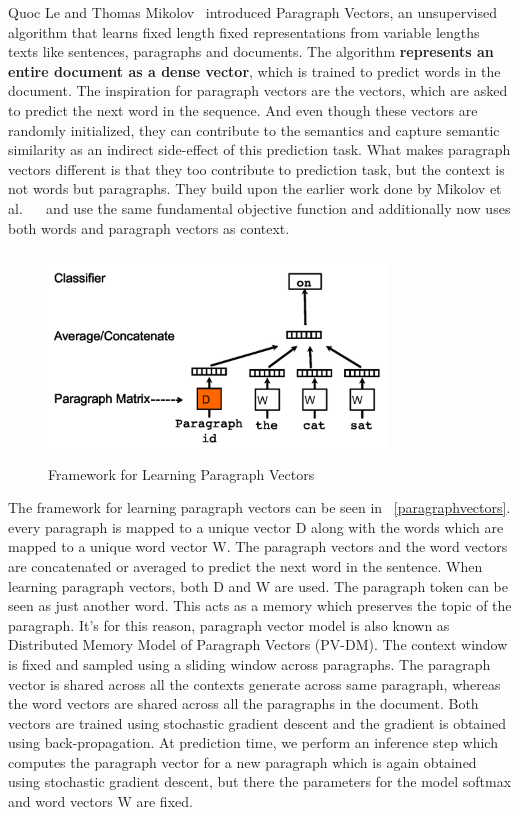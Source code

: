 Quoc Le and Thomas Mikolov~\parencite{paragraphvectors} introduced Paragraph Vectors, an unsupervised algorithm that learns fixed length fixed representations from variable lengths texts like sentences, paragraphs and documents. The algorithm \textbf{represents an entire document as a dense vector}, which is trained to predict words in the document.  The inspiration for paragraph vectors are the vectors, which are asked to predict the next word in the sequence. And even though these vectors are randomly initialized, they can contribute to the semantics and capture semantic similarity as an indirect side-effect of this prediction task. What makes paragraph vectors different is that they too contribute to prediction task, but the context is not words but paragraphs. They build upon the earlier work done by Mikolov et al. ~\parencite{mikolov1}~\parencite{mikolov2} and use the same fundamental objective function and additionally now uses both words and paragraph vectors as context. 

\begin{figure}[ht!]
	\centering
		\includegraphics[height=55mm,  width=90mm]{figures/4_paragraphvectors.png}
		\caption[Learning Paragraph Vectors]{Framework for Learning Paragraph Vectors}
			\label{paragraphvectors}
\end{figure}

The framework for learning paragraph vectors can be seen in ~\autoref{paragraphvectors}. every paragraph is mapped to a unique vector D along with the words which are mapped to a unique word vector W. The paragraph vectors and the word vectors are concatenated or averaged to predict the next word in the sentence. When learning paragraph vectors, both D and W are used. The paragraph token can be seen as just another word. This acts as a memory which preserves the topic of the paragraph. It's for this reason, paragraph vector model is also known as Distributed Memory Model of Paragraph Vectors (PV-DM). The context window is fixed and sampled using a sliding window across paragraphs. The paragraph vector is shared across all the contexts generate across same paragraph, whereas the word vectors are shared across all the paragraphs in the document. Both vectors are trained using stochastic gradient descent and the gradient is obtained using back-propagation. At prediction time, we perform an inference step which computes the paragraph vector for a new paragraph  which is again obtained using stochastic gradient descent, but there the parameters for the model softmax and word vectors W are fixed.  

